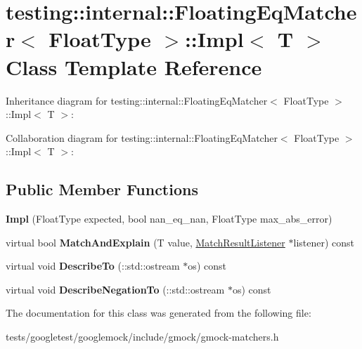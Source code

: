 \hypertarget{classtesting_1_1internal_1_1FloatingEqMatcher_1_1Impl}{}\section{testing\+:\+:internal\+:\+:Floating\+Eq\+Matcher$<$ Float\+Type $>$\+:\+:Impl$<$ T $>$ Class Template Reference}
\label{classtesting_1_1internal_1_1FloatingEqMatcher_1_1Impl}


Inheritance diagram for testing\+:\+:internal\+:\+:Floating\+Eq\+Matcher$<$ Float\+Type $>$\+:\+:Impl$<$ T $>$\+:


Collaboration diagram for testing\+:\+:internal\+:\+:Floating\+Eq\+Matcher$<$ Float\+Type $>$\+:\+:Impl$<$ T $>$\+:
\subsection*{Public Member Functions}
\begin{DoxyCompactItemize}
\item 
\mbox{\label{classtesting_1_1internal_1_1FloatingEqMatcher_1_1Impl_a314057e171f872ad478b3e143121aecd}} 
{\bfseries Impl} (Float\+Type expected, bool nan\+\_\+eq\+\_\+nan, Float\+Type max\+\_\+abs\+\_\+error)
\item 
\mbox{\label{classtesting_1_1internal_1_1FloatingEqMatcher_1_1Impl_a4ce47c481fdc4973ed671a492f455f99}} 
virtual bool {\bfseries Match\+And\+Explain} (T value, \hyperlink{classtesting_1_1MatchResultListener}{Match\+Result\+Listener} $\ast$listener) const
\item 
\mbox{\label{classtesting_1_1internal_1_1FloatingEqMatcher_1_1Impl_aab6dbbe39ef8337e4686ae0f8c81a2c3}} 
virtual void {\bfseries Describe\+To} (\+::std\+::ostream $\ast$os) const
\item 
\mbox{\label{classtesting_1_1internal_1_1FloatingEqMatcher_1_1Impl_a3eff238a812f4a105df1222a28f6cdbf}} 
virtual void {\bfseries Describe\+Negation\+To} (\+::std\+::ostream $\ast$os) const
\end{DoxyCompactItemize}


The documentation for this class was generated from the following file\+:\begin{DoxyCompactItemize}
\item 
tests/googletest/googlemock/include/gmock/gmock-\/matchers.\+h\end{DoxyCompactItemize}

